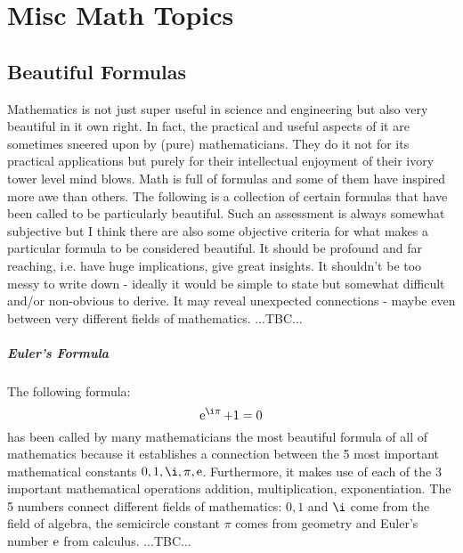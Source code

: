 \chapter{Misc Math Topics}

\section{Beautiful Formulas}
Mathematics is not just super useful in science and engineering but also very beautiful in it own right. In fact, the practical and useful aspects of it are sometimes sneered upon by (pure) mathematicians. They do it not for its practical applications but purely for their intellectual enjoyment of their ivory tower level mind blows. Math is full of formulas and some of them have inspired more awe than others. The following is a collection of certain formulas that have been called to be particularly beautiful. Such an assessment is always somewhat subjective but I think there are also some objective criteria for what makes a particular formula to be considered beautiful. It should be profound and far reaching, i.e. have huge implications, give great insights. It shouldn't be too messy to write down - ideally it would be simple to state but somewhat difficult and/or non-obvious to derive. It may reveal unexpected connections - maybe even between very different fields of mathematics. ...TBC...


\paragraph{Euler's Formula}
The following formula:
\begin{equation}
\e^{\i \pi} + 1 = 0
\end{equation}
has been called by many mathematicians the most beautiful formula of all of mathematics because it establishes a connection between the 5 most important mathematical constants $0,1,\i,\pi,\e$. Furthermore, it makes use of each of the 3 important mathematical operations addition, multiplication, exponentiation. The 5 numbers connect different fields of mathematics: $0,1$ and $\i$ come from the field of algebra, the semicircle constant $\pi$ comes from geometry and Euler's number $\operatorname{\mathrm{e}}$ from calculus. ...TBC...

